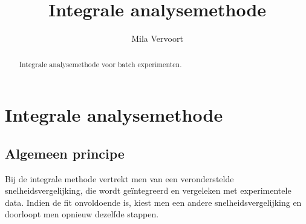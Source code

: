 \documentclass{ximera}
\title{Integrale analysemethode}
\author{Mila Vervoort}
\begin{document}
\begin{abstract}
    Integrale analysemethode voor batch experimenten.
\end{abstract}
\maketitle
\label{xim:Integrale analysemethode}

\section*{Integrale analysemethode}
\label{Integrale analyse methode}
\subsection*{Algemeen principe}

Bij de integrale methode vertrekt men van een veronderstelde snelheidsvergelijking, die wordt geïntegreerd en vergeleken met experimentele data. Indien de fit onvoldoende is, kiest men een andere snelheidsvergelijking en doorloopt men opnieuw dezelfde stappen.
\end{document}
